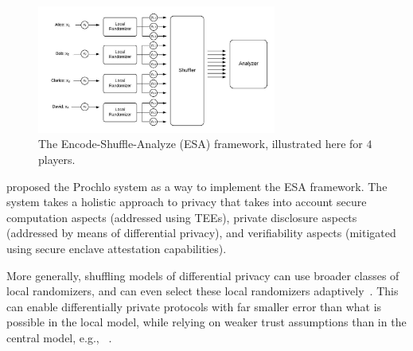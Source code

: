 \begin{figure}[tb]
\centering
\includegraphics[width=0.7\textwidth]{esa_diagram.jpeg}
\caption{The Encode-Shuffle-Analyze (ESA) framework, illustrated here for $4$ players.}
\label{fig:esa}
\end{figure}

\citet{prochlo} proposed the Prochlo system as a way to implement the ESA framework. The system takes a holistic approach to privacy that takes into account secure computation aspects (addressed using TEEs), private disclosure aspects (addressed by means of differential privacy), and verifiability aspects (mitigated using secure enclave attestation capabilities). 

More generally, shuffling models of differential privacy can use broader classes of local randomizers, and can even select these local randomizers adaptively~\cite{erlingsson2019amplification}. This can enable differentially private protocols with far smaller error than what is possible in the local model, while relying on weaker trust assumptions than in the central model, e.g., ~\cite{cheu2019distributed, erlingsson2019amplification,BalleBGN19, ghazi2019scalable_1, ghazi2019scalable, ghazi2019private, pure-dp-shuffled, counting_shuffle_ICML, chen2020distributed}. 


